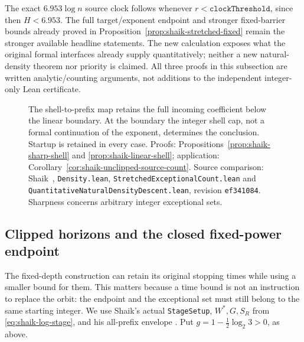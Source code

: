\documentclass[11pt]{article}
\theoremstyle{remark}\newtheorem{remark}[proposition]{Remark}
\begin{document}
The exact \(6.953\log n\) source clock follows whenever
\(r<\texttt{clockThreshold}\), since then \(H<6.953\).
The full target/exponent endpoint and stronger fixed-barrier bounds
already proved in Proposition~\ref{prop:shaik-stretched-fixed} remain
the stronger available headline statements.
The new calculation exposes what the original formal interfaces
already supply quantitatively; neither a new natural-density theorem
nor priority is claimed. All three proofs in this subsection are
written analytic/counting arguments, not additions to the independent
integer-only Lean certificate.

\begin{figure}[ht]
\centering
{}
\caption{The shell-to-prefix map retains the full incoming coefficient
below the linear boundary. At the boundary the integer shell cap, not a
formal continuation of the exponent, determines the conclusion.
Startup is retained in every case. Proofs:
Propositions~\ref{prop:shaik-sharp-shell} and
\ref{prop:shaik-linear-shell}; application:
Corollary~\ref{cor:shaik-unclipped-source-count}.
Source comparison: Shaik~\cite{Shaik2026v324},
\texttt{Density.lean}, \texttt{StretchedExceptionalCount.lean} and
\texttt{QuantitativeNaturalDensityDescent.lean}, revision
\texttt{ef341084}. Sharpness concerns arbitrary integer exceptional sets.}
\end{figure}

\subsection{Clipped horizons and the closed fixed-power endpoint}

The fixed-depth construction can retain its original stopping times while
using a smaller bound for them. This matters because a time bound is not
an instruction to replace the orbit: the endpoint and the exceptional set
must still belong to the same starting integer. We use Shaik's actual
\texttt{StageSetup}, \(W^*,G,S_R\) from
\eqref{eq:shaik-log-stage}, and his all-prefix envelope
\cite{Shaik2026v324}. Put \(g=1-\frac12\log_2 3>0\), as above.
\end{document}
